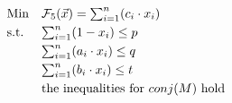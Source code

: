\vspace{-3mm}
\begin{equation}\label{formula:singLP}
\begin{array}{ll@{}r@{}r@{}l}
     \text{Min} & \mathcal{F}_5(\vec x) =\sum\nolimits_{i=1}^{n}(c_i\cdot x_i) \\[\jot]
     \text{s.t.} & \sum\nolimits_{i=1}^{n}(1-x_i) \le p \\[\jot]
      & \sum\nolimits_{i=1}^{n}(a_i\cdot x_i) \le q \\[\jot]
      & \sum\nolimits_{i=1}^{n}(b_i\cdot x_i) \le t\\[\jot]
       & \text{the inequalities for $conj(M)$ hold}\\[\jot]
  \end{array}
\vspace{-3mm}
\end{equation}

